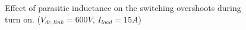 \documentclass[12pt]{article} %
\begin{document}
\begin{figure}[h]
     \centering
        \caption{Effect of parasitic inductance on the switching overshoots during turn on. ($V_{dc,link}=600V$, $I_{load}=15A$)}
	\label{fig:parasiticswitching_turnon}
\end{figure}
\end{document}
